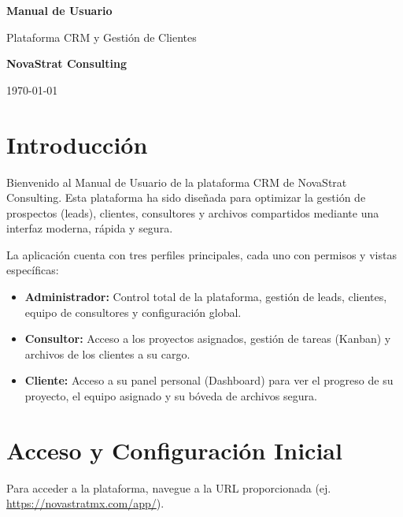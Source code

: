 \documentclass[11pt,a4paper]{article}
\begin{document}
\begin{titlepage}
    \centering
    \vspace*{4cm}
    
    \vspace{2cm}
    
    {\Huge\bfseries\color{NovaTeal} Manual de Usuario\par}
    \vspace{1cm}
    {\Large Plataforma CRM y Gestión de Clientes\par}
    \vspace{2cm}
    {\Large \textbf{NovaStrat Consulting}\par}
    \vfill
    {\large \today\par}
\end{titlepage}

\tableofcontents
\newpage

\section{Introducción}
Bienvenido al Manual de Usuario de la plataforma CRM de NovaStrat Consulting. Esta plataforma ha sido diseñada para optimizar la gestión de prospectos (leads), clientes, consultores y archivos compartidos mediante una interfaz moderna, rápida y segura.

La aplicación cuenta con tres perfiles principales, cada uno con permisos y vistas específicas:
\begin{itemize}
    \item \textbf{Administrador:} Control total de la plataforma, gestión de leads, clientes, equipo de consultores y configuración global.
    \item \textbf{Consultor:} Acceso a los proyectos asignados, gestión de tareas (Kanban) y archivos de los clientes a su cargo.
    \item \textbf{Cliente:} Acceso a su panel personal (Dashboard) para ver el progreso de su proyecto, el equipo asignado y su bóveda de archivos segura.
\end{itemize}

\section{Acceso y Configuración Inicial}
Para acceder a la plataforma, navegue a la URL proporcionada (ej. \url{https://novastratmx.com/app/}).
\end{document}
